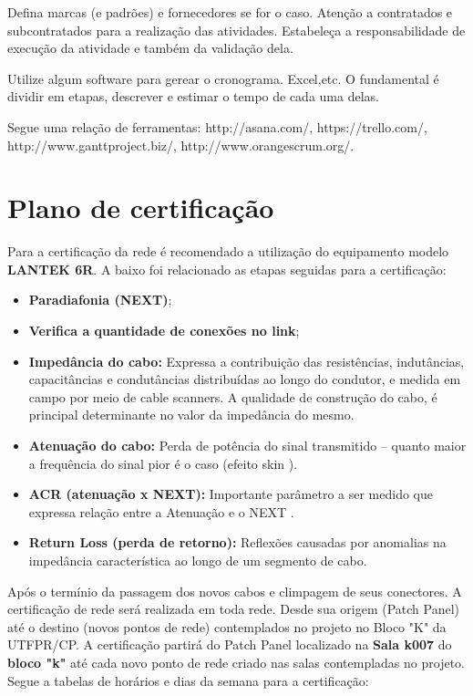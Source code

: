 \documentclass[	DIV=calc,%
							paper=a4,%
							fontsize=12pt,%
							onecolumn]{scrartcl}	 					%
\begin{document}
Defina marcas (e padrões) e fornecedores se for o caso. Atenção a contratados e subcontratados para a realização das atividades. Estabeleça a responsabilidade de execução da atividade e também da validação dela.

Utilize algum software para gerear o cronograma. Excel,etc. O fundamental é dividir em etapas, descrever e estimar o tempo de cada uma delas.

Segue uma relação de ferramentas:
http://asana.com/, 
https://trello.com/, 
http://www.ganttproject.biz/, 
http://www.orangescrum.org/. 

\section{Plano de certificação}
Para a certificação da rede é recomendado a utilização do equipamento modelo \textbf{LANTEK 6R}. 
A baixo foi relacionado as etapas seguidas para a certificação:
\begin{itemize}
\item \textbf{Paradiafonia (NEXT)};
\item \textbf{Verifica a quantidade de conexões no link};
\item \textbf{Impedância do cabo:} Expressa a contribuição das resistências, indutâncias, capacitâncias e condutâncias distribuídas ao longo do condutor, e medida em campo por meio de cable scanners. A qualidade de construção do cabo, é principal determinante no valor da impedância do mesmo.
\item \textbf{Atenuação do cabo:} Perda de potência do sinal transmitido – quanto maior a frequência do sinal pior é o caso (efeito skin ).
\item \textbf{ACR (atenuação x NEXT):} Importante parâmetro a ser medido que expressa relação entre a Atenuação e o NEXT .
\item \textbf{Return Loss (perda de retorno):} Reflexões causadas por anomalias na impedância característica ao longo de um segmento de cabo.
\end{itemize}
Após o termínio da passagem dos novos cabos e climpagem de seus conectores. A certificação de rede será realizada em toda rede. Desde sua origem (Patch Panel) até o destino (novos pontos de rede) contemplados no projeto no Bloco "K" da UTFPR/CP. 
A certificação partirá do Patch Panel localizado na \textbf{Sala k007} do \textbf{bloco "k"} até cada novo ponto de rede criado nas salas contempladas no projeto. 
Segue a tabelas de horários e dias da semana para a certificação:

\end{document}
